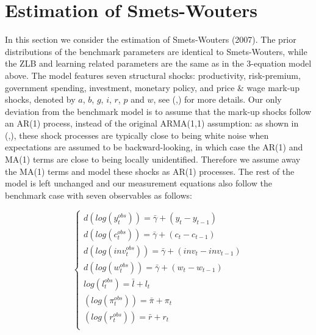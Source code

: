 \documentclass[12pt,reqno]{article}
\numberwithin{equation}{section}
\begin{document}
\begin{figure}[H]
\end{figure}

\section{Estimation of Smets-Wouters}

In this section we consider the estimation of Smets-Wouters (2007). The prior distributions of the benchmark parameters are identical to Smets-Wouters, while the ZLB and learning related parameters are the same as in the 3-equation model above. The model features seven structural shocks: productivity, risk-premium, government spending, investment, monetary policy, and 
price \& wage mark-up shocks, denoted by $a$, $b$, $g$, $i$, $r$, $p$ and $w$, see \citeauthor{smets2007shocks} (\citeyear{smets2003estimated},\citeyear{smets2007shocks}) for more details. Our only deviation from the benchmark model is to assume that the mark-up shocks follow an AR(1) process, instead of the original ARMA(1,1) assumption: as shown in \citeauthor{smets2007shocks} (\citeyear{smets2003estimated},\citeyear{smets2007shocks}), these shock processes are typically close to being white noise when expectations are assumed to be backward-looking, in which case the AR(1) and MA(1) terms are close to being locally unidentified. Therefore we assume away the MA(1) terms and model these shocks as AR(1) processes. The rest of the model is left unchanged and our measurement equations also follow the benchmark case with seven observables as follows:

$$
\begin{cases}
 d( log(y^{obs}_t)) = \bar{\gamma} + (y_t - y_{t-1} ) \\
d(log(c^{obs}_t)) = \bar{\gamma} + (c_t - c_{t-1} )\\
d(log({inv}^{obs}_t)) = \bar{\gamma} + ({inv}_t - inv_{t-1} )\\
d(log(w^{obs}_t)) = \bar{\gamma} + (w_t - w_{t-1} )\\
log(l^{obs}_t) = \bar{l} + l_t\\
(log(\pi^{obs}_t)) = \bar{\pi} + \pi_t \\
(log(r^{obs}_t)) = \bar{r} + r_t\\
\end{cases}
$$
\end{document}
